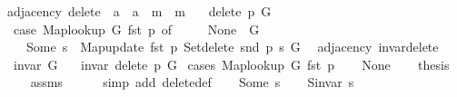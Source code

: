 \begin{isabellebody}
\isamarkupfalse%
\ {\isacharparenleft}{\kern0pt}\ adjacency{\isacharparenright}{\kern0pt}\ delete\ {\isacharcolon}{\kern0pt}{\isacharcolon}{\kern0pt}\ {\isachardoublequoteopen}{\isacharprime}{\kern0pt}a\ {\isasymtimes}\ {\isacharprime}{\kern0pt}a\ {\isasymRightarrow}\ {\isacharprime}{\kern0pt}m\ {\isasymRightarrow}\ {\isacharprime}{\kern0pt}m{\isachardoublequoteclose}\ \isanewline
\ \ {\isachardoublequoteopen}delete\ p\ G\ {\isasymequiv}\isanewline
\ \ \ case\ Map{\isacharunderscore}{\kern0pt}lookup\ G\ {\isacharparenleft}{\kern0pt}fst\ p{\isacharparenright}{\kern0pt}\ of\isanewline
\ \ \ \ \ None\ {\isasymRightarrow}\ G\ {\isacharbar}{\kern0pt}\isanewline
\ \ \ \ \ Some\ s\ {\isasymRightarrow}\ Map{\isacharunderscore}{\kern0pt}update\ {\isacharparenleft}{\kern0pt}fst\ p{\isacharparenright}{\kern0pt}\ {\isacharparenleft}{\kern0pt}Set{\isacharunderscore}{\kern0pt}delete\ {\isacharparenleft}{\kern0pt}snd\ p{\isacharparenright}{\kern0pt}\ s{\isacharparenright}{\kern0pt}\ G{\isachardoublequoteclose}\isanewline
\isanewline
{}\isamarkupfalse%
\ {\isacharparenleft}{\kern0pt}\ adjacency{\isacharparenright}{\kern0pt}\ invar{\isacharunderscore}{\kern0pt}delete{\isacharcolon}{\kern0pt}\isanewline
\ \ \ {\isachardoublequoteopen}invar\ G{\isachardoublequoteclose}\isanewline
\ \ \ {\isachardoublequoteopen}invar\ {\isacharparenleft}{\kern0pt}delete\ p\ G{\isacharparenright}{\kern0pt}{\isachardoublequoteclose}\isanewline
%
\isadelimproof
%
\endisadelimproof
%
\isatagproof
{}\isamarkupfalse%
\ {\isacharparenleft}{\kern0pt}cases\ {\isachardoublequoteopen}Map{\isacharunderscore}{\kern0pt}lookup\ G\ {\isacharparenleft}{\kern0pt}fst\ p{\isacharparenright}{\kern0pt}{\isachardoublequoteclose}{\isacharparenright}{\kern0pt}\isanewline
\ \ \isamarkupfalse%
\ None\isanewline
\ \ \isamarkupfalse%
\ {\isacharquery}{\kern0pt}thesis\isanewline
\ \ \ \ \isamarkupfalse%
\ assms\isanewline
\ \ \ \ \isamarkupfalse%
\ {\isacharparenleft}{\kern0pt}simp\ add{\isacharcolon}{\kern0pt}\ delete{\isacharunderscore}{\kern0pt}def{\isacharparenright}{\kern0pt}\isanewline
{}\isamarkupfalse%
\isanewline
\ \ \isamarkupfalse%
\ {\isacharparenleft}{\kern0pt}Some\ s{\isacharparenright}{\kern0pt}\isanewline
\ \ \isamarkupfalse%
\ {\isachardoublequoteopen}S{\isachardot}{\kern0pt}invar\ s{\isachardoublequoteclose}\isanewline
\ \ \ \ \isamarkupfalse%

\end{isabellebody}
